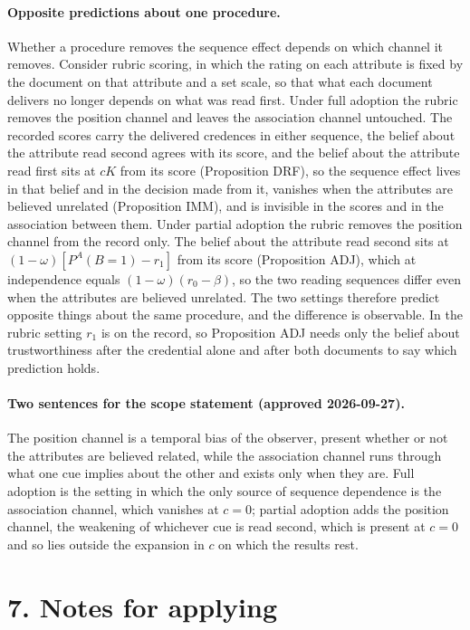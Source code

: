 \documentclass[11pt,a4paper]{article}
\begin{document}
\paragraph{Opposite predictions about one procedure.}
Whether a procedure removes the sequence effect depends on which channel it
removes. Consider rubric scoring, in which the rating on each attribute is
fixed by the document on that attribute and a set scale, so that what each
document delivers no longer depends on what was read first. Under full
adoption the rubric removes the position channel and leaves the association
channel untouched. The recorded scores carry the delivered credences in
either sequence, the belief about the attribute read second agrees with its
score, and the belief about the attribute read first sits at $cK$ from its
score (Proposition DRF), so the sequence effect lives in that belief and in
the decision made from it, vanishes when the attributes are believed
unrelated (Proposition IMM), and is invisible in the scores and in the
association between them. Under partial adoption the rubric removes the
position channel from the record only. The belief about the attribute read
second sits at $(1-\omega)[P^{A}(B{=}1)-r_1]$ from its score (Proposition
ADJ), which at independence equals $(1-\omega)(r_0-\beta)$, so the two
reading sequences differ even when the attributes are believed unrelated.
The two settings therefore predict opposite things about the same procedure,
and the difference is observable. In the rubric setting $r_1$ is on the
record, so Proposition ADJ needs only the belief about trustworthiness after
the credential alone and after both documents to say which prediction holds.

\paragraph{Two sentences for the scope statement (approved 2026-09-27).}
The position channel is a temporal bias of the observer, present whether or
not the attributes are believed related, while the association channel runs
through what one cue implies about the other and exists only when they are.
Full adoption is the setting in which the only source of sequence dependence
is the association channel, which vanishes at $c=0$; partial adoption adds
the position channel, the weakening of whichever cue is read second, which is
present at $c=0$ and so lies outside the expansion in $c$ on which the
results rest.

\section*{7. Notes for applying}
\end{document}
